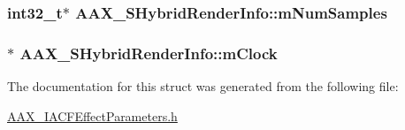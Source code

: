 \subsubsection[{m\+Num\+Samples}]{\setlength{\rightskip}{0pt plus 5cm}int32\+\_\+t$\ast$ A\+A\+X\+\_\+\+S\+Hybrid\+Render\+Info\+::m\+Num\+Samples}\label{a00121_a57a29e2772721e1c9276b9114dc212a2}
\hypertarget{a00121_ad98d7a8b5a0cfee06b31a81fe9ebe7fb}{}
\subsubsection[{m\+Clock}]{$\ast$ A\+A\+X\+\_\+\+S\+Hybrid\+Render\+Info\+::m\+Clock}\label{a00121_ad98d7a8b5a0cfee06b31a81fe9ebe7fb}


The documentation for this struct was generated from the following file\+:\begin{DoxyCompactItemize}
\item 
\hyperlink{a00224}{A\+A\+X\+\_\+\+I\+A\+C\+F\+Effect\+Parameters.\+h}\end{DoxyCompactItemize}
